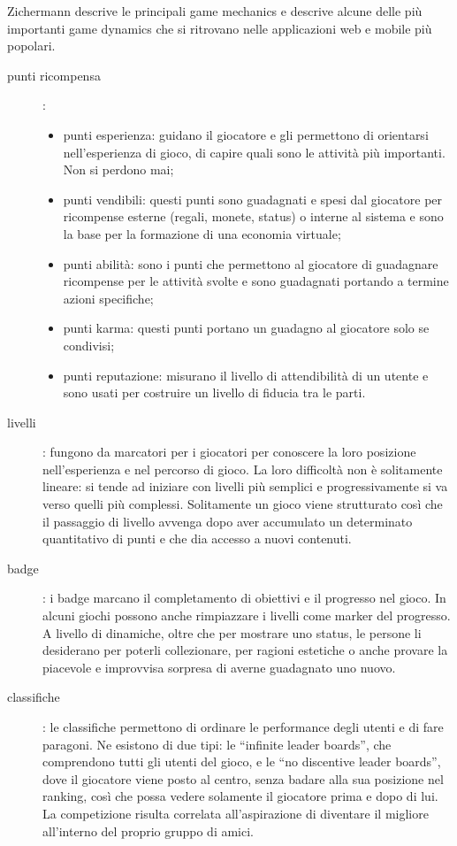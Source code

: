 Zichermann descrive le principali game mechanics e descrive alcune delle più importanti game dynamics che si ritrovano nelle applicazioni web e mobile più popolari.

\begin{description}
    \item[punti ricompensa]:
    \begin{itemize}
        \item punti esperienza: guidano il giocatore e gli permettono di orientarsi nell'esperienza di gioco, di capire quali sono le attività più importanti. Non si perdono mai;
        \item punti vendibili: questi punti sono guadagnati e spesi dal giocatore per ricompense esterne (regali, monete, status) o interne al sistema e sono la base per la formazione di una economia virtuale;
        \item punti abilità: sono i punti che permettono al giocatore di guadagnare ricompense per le attività svolte e sono guadagnati portando a termine azioni specifiche;
        \item punti karma: questi punti portano un guadagno al giocatore solo se condivisi;
        \item punti reputazione: misurano il livello di attendibilità di un utente e sono usati per costruire un livello di fiducia tra le parti.
    \end{itemize} 
    \item[livelli]: fungono da marcatori per i giocatori per conoscere la loro posizione nell'esperienza e nel percorso di gioco. La loro difficoltà non è solitamente lineare: si tende ad iniziare con livelli più semplici e progressivamente si va verso quelli più complessi. Solitamente un gioco viene strutturato così che il passaggio di livello avvenga dopo aver accumulato un determinato quantitativo di punti e che dia accesso a nuovi contenuti.
    \item[badge]: i badge marcano il completamento di obiettivi e il progresso nel gioco. In alcuni giochi possono anche rimpiazzare i livelli come marker del progresso. A livello di dinamiche, oltre che per mostrare uno status, le persone li desiderano per poterli collezionare, per ragioni estetiche o anche provare la piacevole e improvvisa sorpresa di averne guadagnato uno nuovo.
    \item[classifiche]: le classifiche permettono di ordinare le performance degli utenti e di fare paragoni. Ne esistono di due tipi: le ``infinite leader boards'', che comprendono tutti gli utenti del gioco, e le ``no discentive leader boards'', dove il giocatore viene posto al centro, senza badare alla sua posizione nel ranking, così che possa vedere solamente il giocatore prima e dopo di lui. La competizione risulta correlata all'aspirazione di diventare il migliore all'interno del proprio gruppo di amici.

\end{description}
